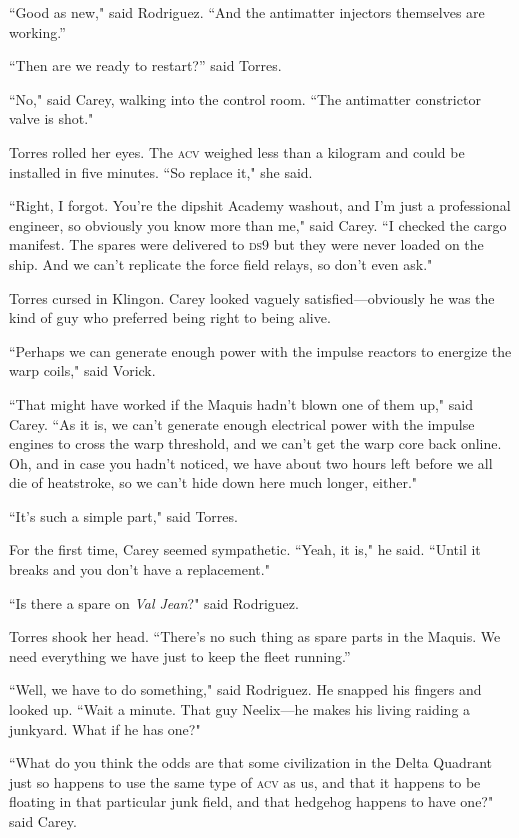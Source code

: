 \documentclass[twoside,letterpaper,12pt]{memoir}
\begin{document}
``Good as new," said Rodriguez. ``And the antimatter injectors themselves are working.”

``Then are we ready to restart?” said Torres.

``No," said Carey, walking into the control room. ``The antimatter constrictor valve is shot."

Torres rolled her eyes. The \textsc{acv} weighed less than a kilogram and could be installed in five minutes. ``So replace it," she said.

``Right, I forgot. You're the dipshit Academy washout, and I'm just a professional engineer, so obviously you know more than me," said Carey. ``I checked the cargo manifest. The spares were delivered to \textsc{ds9} but they were never loaded on the ship. And we can't replicate the force field relays, so don't even ask."

Torres cursed in Klingon. Carey looked vaguely satisfied---obviously he was the kind of guy who preferred being right to being alive.

``Perhaps we can generate enough power with the impulse reactors to energize the warp coils," said Vorick.

``That might have worked if the Maquis hadn't blown one of them up," said Carey. ``As it is, we can't generate enough electrical power with the impulse engines to cross the warp threshold, and we can't get the warp core back online. Oh, and in case you hadn't noticed, we have about two hours left before we all die of heatstroke, so we can't hide down here much longer, either."

``It's such a simple part," said Torres.

For the first time, Carey seemed sympathetic. ``Yeah, it is," he said. ``Until it breaks and you don't have a replacement."

``Is there a spare on \textit{Val Jean}?" said Rodriguez.

Torres shook her head. ``There’s no such thing as spare parts in the Maquis. We need everything we have just to keep the fleet running.”

``Well, we have to do something," said Rodriguez. He snapped his fingers and looked up. ``Wait a minute. That guy Neelix---he makes his living raiding a junkyard. What if he has one?"

``What do you think the odds are that some civilization in the Delta Quadrant just so happens to use the same type of \textsc{acv} as us, and that it happens to be floating in that particular junk field, and that hedgehog happens to have one?" said Carey.
\end{document}
